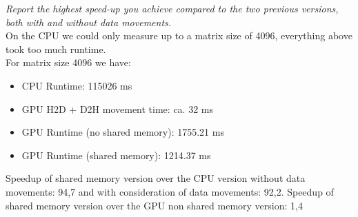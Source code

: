 \documentclass[12pt]{article}
\begin{document}
\noindent\emph{Report the highest speed-up you achieve compared to the two previous versions, both with and without data movements.}\\
On the CPU we could only measure up to a matrix size of 4096, everything above took too much runtime.\\
For  matrix size 4096 we have:
\begin{itemize}
	\item CPU Runtime: 115026 ms
	\item GPU H2D + D2H movement time: ca. 32 ms
	\item GPU Runtime (no shared memory): 1755.21 ms
	\item GPU Runtime (shared memory): 1214.37 ms
\end{itemize}
Speedup of shared memory version over the CPU version without data movements: 94,7 and with consideration of data movements: 92,2.
Speedup of shared memory version over the GPU non shared memory version: 1,4
\end{document}

